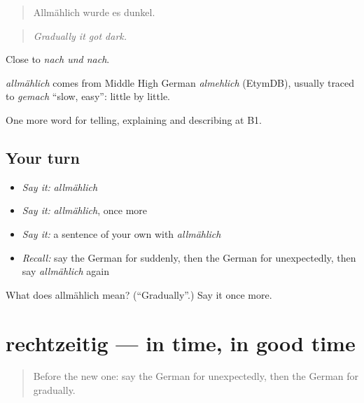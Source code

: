 \begin{quote}
Allmählich wurde es dunkel.
\end{quote}

\begin{quote}
\emph{Gradually it got dark.}
\end{quote}

Close to \emph{nach und nach}.

\begin{cousinweb}
\emph{allmählich} comes from Middle High German \emph{almehlich} (EtymDB), usually traced to \emph{gemach} \textquotedblleft{}slow, easy\textquotedblright{}: little by little.
\end{cousinweb}

\begin{grammarlens}[title={What you've built}]
One more word for telling, explaining and describing at B1.
\end{grammarlens}

\subsection*{Your turn}
\begin{itemize}
\raggedright
  \item \emph{Say it:} \emph{allmählich}
  \item \emph{Say it:} \emph{allmählich}, once more
  \item \emph{Say it:} a sentence of your own with \emph{allmählich}
  \item \emph{Recall:} say the German for suddenly, then the German for unexpectedly, then say \emph{allmählich} again
\end{itemize}

\begin{tcolorbox}[breakable,colback=teal!4,colframe=teal!35!black,title={Before you move on}]
What does allmählich mean? (\textquotedblleft{}Gradually\textquotedblright{}.) Say it once more.
\end{tcolorbox}
\section[rechtzeitig]{rechtzeitig — in time, in good time}

\label{lesson:GE-C266-rechtzeitig}



\begin{quote}
Before the new one: say the German for unexpectedly, then the German for gradually.
\end{quote}

